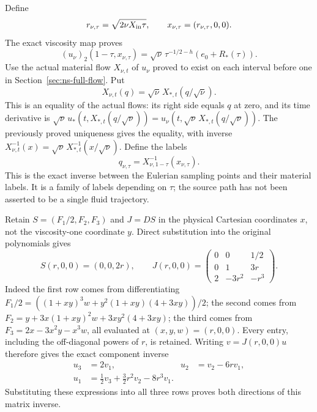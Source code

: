 Define
\[
 r_{\nu,\tau}=\sqrt{2\nu X_{\rm in}\tau},\qquad
 x_{\nu,\tau}=(r_{\nu,\tau},0,0).
\]
The exact viscosity map proves
\begin{equation}
 (u_\nu)_2(1-\tau,x_{\nu,\tau})
 =\sqrt\nu\,\tau^{-1/2-h}(e_0+R_*(\tau)).
 \label{naw:actualswirl}
\end{equation}
Use the actual material flow $X_{\nu,t}$ of $u_\nu$ proved to exist
on each interval before one in Section~\ref{sec:ns-full-flow}. Put
\[
 X_{\nu,t}(q)=\sqrt\nu\,X_{*,t}(q/\sqrt\nu).
\]
This is an equality of the actual flows: its right side equals $q$ at
zero, and its time derivative is
$\sqrt\nu\,u_*(t,X_{*,t}(q/\sqrt\nu))
 =u_\nu(t,\sqrt\nu\,X_{*,t}(q/\sqrt\nu))$.
The previously proved uniqueness gives the equality, with inverse
$X_{\nu,t}^{-1}(x)=\sqrt\nu\,X_{*,t}^{-1}(x/\sqrt\nu)$.
Define the labels
\[
 q_{\nu,\tau}=X_{\nu,1-\tau}^{-1}(x_{\nu,\tau}).
\]
This is the exact inverse between the Eulerian sampling points and
their material labels. It is a family of labels depending on $\tau$;
the source path has not been asserted to be a single fluid trajectory.

Retain $S=(F_1/2,F_2,F_3)$ and $J=DS$ in the physical Cartesian
coordinates $x$, not the viscosity-one coordinate $y$. Direct
substitution into the original polynomials gives
\[
 S(r,0,0)=(0,0,2r),\qquad
 J(r,0,0)=\begin{pmatrix}
 0&0&1/2\\0&1&3r\\2&-3r^2&-r^3
 \end{pmatrix}.
\]
Indeed the first row comes from differentiating
$F_1/2=((1+xy)^3w+y^2(1+xy)(4+3xy))/2$;
the second comes from
$F_2=y+3x(1+xy)^2w+3xy^2(4+3xy)$; the third comes from
$F_3=2x-3x^2y-x^3w$, all evaluated at $(x,y,w)=(r,0,0)$.
Every entry, including the off-diagonal powers of $r$, is retained.
Writing $v=J(r,0,0)u$ therefore gives the exact component inverse
\begin{align*}
 u_3&=2v_1, &u_2&=v_2-6rv_1,\\
 u_1&=\tfrac12v_3+\tfrac32r^2v_2-8r^3v_1.
\end{align*}
Substituting these expressions into all three rows proves both
directions of this matrix inverse.

